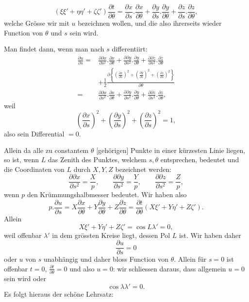 %
\[
(\xi\xi'+\eta\eta'+\zeta\zeta')\frac{\partial t}{\partial\theta}=\frac{\partial x}{\partial s}.\frac{\partial x}{\partial\theta}+\frac{\partial y}{\partial s}.\frac{\partial y}{\partial\theta}+\frac{\partial z}{\partial s}.\frac{\partial z}{\partial\theta},
\]
welche Grösse wir mit $u$ bezeichnen wollen, und die also ihrerseits wieder Function von $\theta$ und $s$ sein wird.

Man findet dann, wenn man nach $s$ differentiirt:
\[
\begin{aligned}
\frac{\partial u}{\partial s}={}&\frac{\partial\partial x}{\partial s^{2}}.\frac{\partial x}{\partial\theta}+\frac{\partial\partial y}{\partial s^{2}}.\frac{\partial y}{\partial\theta}+\frac{\partial\partial z}{\partial s^{2}}.\frac{\partial z}{\partial\theta}\\
&+\tfrac12\frac{\partial\left\{\left(\frac{\partial x}{\partial s}\right)^{2}+\left(\frac{\partial y}{\partial s}\right)^{2}+\left(\frac{\partial z}{\partial s}\right)^{2}\right\}}{\partial\theta}\\
={}&\frac{\partial\partial x}{\partial s^{2}}.\frac{\partial x}{\partial\theta}+\frac{\partial\partial y}{\partial s^{2}}.\frac{\partial y}{\partial\theta}+\frac{\partial\partial z}{\partial s^{2}}.\frac{\partial z}{\partial\theta},
\end{aligned}
\]
weil
\[
\left(\frac{\partial x}{\partial s}\right)^{2}+\left(\frac{\partial y}{\partial s}\right)^{2}+\left(\frac{\partial z}{\partial s}\right)^{2}=1,
\]
also sein Differential $=0$.

Allein da alle zu constantem $\theta$ [gehörigen] Punkte in einer kürzesten Linie liegen, so ist, wenn $L$ das Zenith des Punktes, welchem $s,\theta$ entsprechen, bedeutet und die Coordinaten von $L$ durch $X,Y,Z$ bezeichnet werden:
\[
\frac{\partial\partial x}{\partial s^{2}}=\frac{X}{p},\qquad\frac{\partial\partial y}{\partial s^{2}}=\frac{Y}{p},\qquad\frac{\partial\partial z}{\partial s^{2}}=\frac{Z}{p},
\]
wenn $p$ den Krümmungshalbmesser bedeutet. Wir haben also
\[
p.\frac{\partial u}{\partial s}=X\frac{\partial x}{\partial\theta}+Y\frac{\partial y}{\partial\theta}+Z\frac{\partial z}{\partial\theta}=\frac{\partial t}{\partial\theta}(X\xi'+Y\eta'+Z\zeta').
\]
Allein
\[
X\xi'+Y\eta'+Z\zeta'=\cos L\lambda'=0,
\]
weil offenbar $\lambda'$ in dem grössten Kreise liegt, dessen Pol $L$ ist. Wir haben daher
\[
\frac{\partial u}{\partial s}=0
\]
oder $u$ von $s$ unabhängig und daher bloss Function von $\theta$. Allein für $s=0$ ist offenbar $t=0$, $\frac{\partial t}{\partial\theta}=0$ und also $u=0$: wir schliessen daraus, dass allgemein $u=0$ sein wird oder
\[
\cos\lambda\lambda'=0.
\]
Es folgt hieraus der schöne Lehrsatz:

